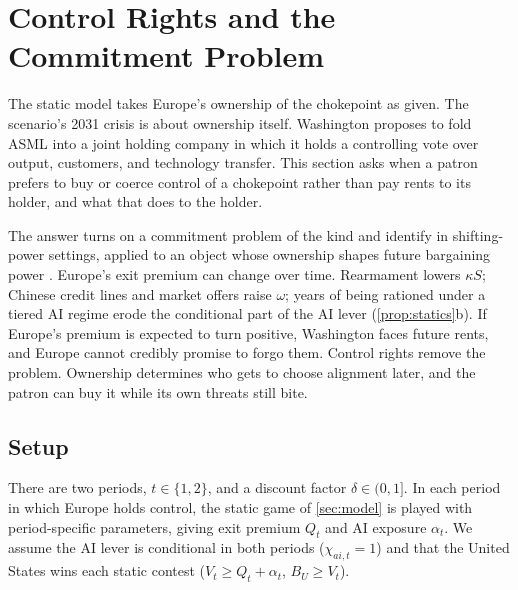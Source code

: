 \section{Control Rights and the Commitment Problem}\label{sec:control}

The static model takes Europe's ownership of the chokepoint as given. The scenario's 2031 crisis is about ownership itself. Washington proposes to fold ASML into a joint holding company in which it holds a controlling vote over output, customers, and technology transfer. This section asks when a patron prefers to buy or coerce control of a chokepoint rather than pay rents to its holder, and what that does to the holder.

The answer turns on a commitment problem of the kind \citet{fearon1995rationalist} and \citet{powell2006war} identify in shifting-power settings, applied to an object whose ownership shapes future bargaining power \citep{fearon1996bargaining}. Europe's exit premium can change over time. Rearmament lowers $\kappa S$; Chinese credit lines and market offers raise $\omega$; years of being rationed under a tiered AI regime erode the conditional part of the AI lever (\cref{prop:statics}b). If Europe's premium is expected to turn positive, Washington faces future rents, and Europe cannot credibly promise to forgo them. Control rights remove the problem. Ownership determines who gets to choose alignment later, and the patron can buy it while its own threats still bite.

\subsection{Setup}

There are two periods, $t \in \{1,2\}$, and a discount factor $\delta \in (0,1]$. In each period in which Europe holds control, the static game of \cref{sec:model} is played with period-specific parameters, giving exit premium $Q_t$ and AI exposure $\alpha_t$. We assume the AI lever is conditional in both periods ($\chi_{ai,t}=1$) and that the United States wins each static contest ($V_t \geq Q_t + \alpha_t$, $B_U \geq V_t$).

